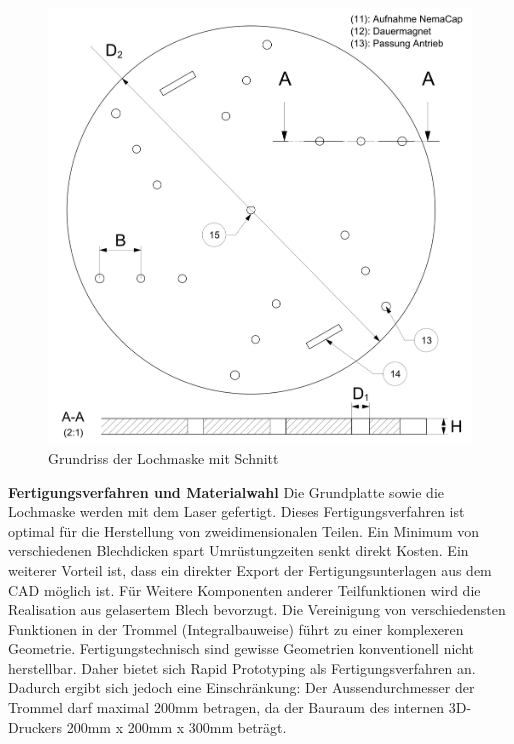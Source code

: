 	\begin{figure}[H]
	\includegraphics[scale=0.63]{Illustrationen/6-Umsetzung/detail_lochmaske.jpg}
	\caption{Grundriss der Lochmaske mit Schnitt}
	\label{fig:detail_lochmaske}
	\end{figure}
\textbf{Fertigungsverfahren und Materialwahl}
\newline
 Die Grundplatte sowie die Lochmaske werden mit dem Laser gefertigt. Dieses Fertigungsverfahren ist optimal für die Herstellung von zweidimensionalen Teilen. Ein Minimum von verschiedenen Blechdicken spart Umrüstungzeiten senkt direkt Kosten. Ein weiterer Vorteil ist, dass ein direkter Export der Fertigungsunterlagen aus dem CAD möglich ist. Für Weitere Komponenten anderer Teilfunktionen wird die Realisation aus gelasertem Blech bevorzugt.
\newline
\newline
Die Vereinigung von verschiedensten Funktionen in der Trommel (Integralbauweise) führt zu einer komplexeren Geometrie. Fertigungstechnisch sind gewisse Geometrien konventionell nicht herstellbar. Daher bietet sich Rapid Prototyping als Fertigungsverfahren an. Dadurch ergibt sich jedoch eine Einschränkung: Der Aussendurchmesser der Trommel darf maximal 200mm betragen, da der Bauraum des internen 3D-Druckers 200mm x 200mm x 300mm beträgt. 